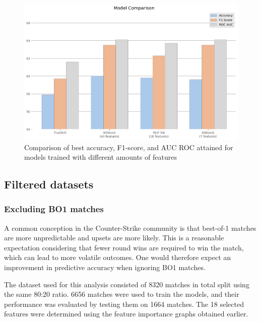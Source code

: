 \begin{figure}[h]
	\centering
	\begin{adjustbox}{center}
		\includegraphics[width=1.1\textwidth]{Figures/results-bars.png}
	\end{adjustbox}
	\caption{Comparison of best accuracy, F1-score, and AUC ROC attained for models trained with different amounts of features}
	\label{fig:full-data-bars}
\end{figure}

\subsection{Filtered datasets}

\subsubsection{Excluding BO1 matches}

A common conception in the Counter-Strike community is that best-of-1 matches are more unpredictable and upsets are more likely. This is a reasonable expectation considering that fewer round wins are required to win the match, which can lead to more volatile outcomes. One would therefore expect an improvement in predictive accuracy when ignoring BO1 matches.

The dataset used for this analysis consisted of 8320 matches in total split using the same 80:20 ratio. 6656 matches were used to train the models, and their performance was evaluated by testing them on 1664 matches. The 18 selected features were determined using the feature importance graphs obtained earlier.

